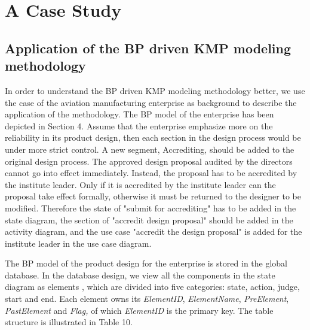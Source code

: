 \documentclass{elsarticle}
\begin{document}
\section{A Case
Study}
\label{sec:case-study-1}

\subsection{Application of the BP driven KMP modeling methodology}
\label{sec:appl-bp-driv-1}
\textrm{In order to understand the BP driven KMP modeling methodology
better, we use the case of the aviation manufacturing enterprise as
background to describe the application of the methodology. The BP model
of the enterprise has been depicted in Section 4. Assume that the
enterprise emphasize more on the reliability in its product design,
then each section in the design process would be under more strict
control. A new segment, Accrediting, should be added to the
original design process. The approved design proposal audited by
the directors cannot go into effect immediately. Instead, the proposal
has to be accredited by the institute leader. Only if it is
accredited by the institute leader can the proposal take effect
formally, otherwise it must be returned to the designer to be
modified. Therefore the state of "submit for
accrediting" has to be added in the state diagram, 
the section of "accredit design proposal"
should be added in the activity diagram, and the use case
"accredit the design proposal" is added for
the institute leader in the use case diagram.}


\textrm{The BP model of the product design for the enterprise is stored
in the global database. In the database design, we
view all the components in the state diagram as elements , which are
divided into five categories: state, action, judge, start and end. Each
element owns its }\textrm{\textit{ElementID}}\textrm{,
}\textrm{\textit{ElementName}}\textrm{,
}\textrm{\textit{PreElement}}\textrm{,
}\textrm{\textit{PastElement}}\textrm{ and
}\textrm{\textit{Flag,}}\textrm{ of which}\textrm{\textit{
ElementID}}\textrm{ is the primary key. The table structure is
illustrated in Table 10.}
\end{document}
